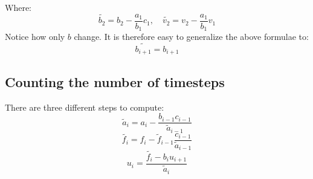 \documentclass[a4paper, 10pt]{article}
\begin{document}
Where:
$$\tilde{b_2}=b_2-\frac{a_1}{b_1}c_1, \quad \tilde{v_2}=v_2-\frac{a_1}{b_1}v_1$$
Notice how only $b$ change. It is therefore easy to generalize the above formulae to:
$$\tilde{b_{i+1}}=b_{i+1}$$
\subsection*{Counting the number of timesteps}
There are three different steps to compute:
\begin{equation}
\tilde{a}_i=a_i-\frac{b_{i-1}c_{i-1}}{\tilde{a}_{i-1}}
\end{equation}
\begin{equation}
\tilde{f_i}=f_i-\tilde{f}_{i-1}\frac{c_{i-1}}{\tilde{a}_{i-1}}
\end{equation}
\begin{equation}
u_i=\frac{\tilde{f_i}-b_iu_{i+1}}{\tilde{a}_i}
\end{equation}
\end{document}
